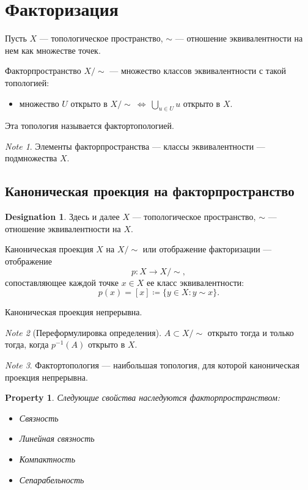 \documentclass[11pt]{book}
\theoremstyle{definition}
\theoremstyle{plain}
\theoremstyle{plain}
\newtheorem*{prop}{Property}
\theoremstyle{definition}
\newtheorem*{name}{Designation}
\theoremstyle{remark}
\newtheorem*{note}{Note}
\begin{document}
\section{Факторизация}
\begin{defn}
    Пусть $ X$ --- топологическое пространство, $ \sim $ --- отношение эквивалентности на нем как множестве точек.

    {\sf Факторпространство} $ X/\!\sim $ --- множество классов эквивалентности с такой топологией:
    \begin{itemize}
	\item  множество $ U$ открыто в $ X/\!\sim ~\Longleftrightarrow ~\bigcup_{u \in  U} u$ открыто в $ X$.
    \end{itemize}
    Эта топология называется {\sf фактортопологией}.
\end{defn}
\begin{note}
    Элементы факторпространства --- классы эквивалентности  --- подмножества $ X$.
\end{note}
\subsection{Каноническая проекция на факторпространство}
\begin{name}
    Здесь и далее $ X$ ---  топологическое пространство, $ \sim $ --- отношение эквивалентности на $ X$.
\end{name}
\begin{defn}
    {\sf Каноническая проекция} $ X$ на $ X /\! \sim $ или {\sf отображение факторизации} --- отображение
    \[
	p: X \to  X/\!\sim
    ,\]
    сопоставляющее каждой точке $ x \in  X$ ее класс эквивалентности:
    \[
	p(x) = [x]\coloneqq \{y \in  X: y \sim x\}
    .\]
\end{defn}
\begin{thm}
    Каноническая проекция непрерывна.
\end{thm}
\begin{note}[Переформулировка определения]
    $ A \subset X / \!\sim $ открыто тогда и только тогда, когда  $ p^{-1}(A)$ открыто в $ X$.
\end{note}
\begin{note}
    Фактортопология --- наибольшая топология, для которой каноническая проекция непрерывна.
\end{note}
\begin{prop}
    Следующие свойства наследуются факторпространством:
    $ $
    \begin{itemize}[noitemsep]
	\item Связность
	\item Линейная связность
	\item Компактность
	\item Сепарабельность
    \end{itemize}
\end{prop}
\end{document}
